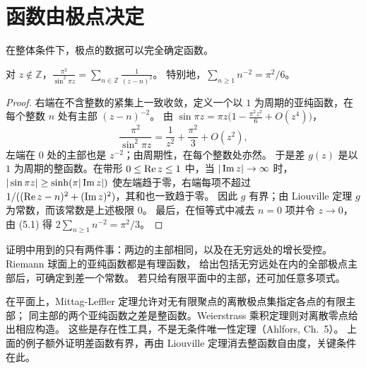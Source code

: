 \documentclass[11pt]{article}
\begin{document}
\section{函数由极点决定}
在整体条件下，极点的数据可以完全确定函数。
\begin{proposition}\label{prop:sin}
对 $z\notin\mathbb Z$，$\displaystyle\frac{\pi^2}{\sin^2\pi z}=\sum_{n\in\mathbb Z}\frac1{(z-n)^2}$。
特别地，$\sum_{n\ge1}n^{-2}=\pi^2/6$。
\end{proposition}
\begin{proof}
右端在不含整数的紧集上一致收敛，定义一个以 $1$ 为周期的亚纯函数，在每个整数 $n$ 处有主部 $(z-n)^{-2}$。
由 $\sin\pi z=\pi z\bigl(1-\tfrac{\pi^2z^2}6+O(z^4)\bigr)$，
\[
 \frac{\pi^2}{\sin^2\pi z}=\frac1{z^2}+\frac{\pi^2}3+O(z^2),                  \tag{5.1}
\]
左端在 $0$ 处的主部也是 $z^{-2}$；由周期性，在每个整数处亦然。
于是差 $g(z)$ 是以 $1$ 为周期的整函数。在带形 $0\le\operatorname{Re} z\le1$ 中，当 $|\operatorname{Im} z|\to\infty$ 时，
$|\sin\pi z|\ge\sinh(\pi|\operatorname{Im} z|)$ 使左端趋于零，右端每项不超过 $1/((\operatorname{Re} z-n)^2+(\operatorname{Im} z)^2)$，其和也一致趋于零。
因此 $g$ 有界；由 Liouville 定理 $g$ 为常数，而该常数是上述极限 $0$。
最后，在恒等式中减去 $n=0$ 项并令 $z\to0$，由 (5.1) 得 $2\sum_{n\ge1}n^{-2}=\pi^2/3$。
\end{proof}
证明中用到的只有两件事：两边的主部相同，以及在无穷远处的增长受控。
Riemann 球面上的亚纯函数都是有理函数，
给出包括无穷远处在内的全部极点主部后，可确定到差一个常数。
若只给有限平面中的主部，还可加任意多项式。

在平面上，Mittag-Leffler 定理允许对无有限聚点的离散极点集指定各点的有限主部；
同主部的两个亚纯函数之差是整函数。Weierstrass 乘积定理则对离散零点给出相应构造。
这些是存在性工具，不是无条件唯一性定理（Ahlfors, Ch.~5）。
上面的例子额外证明差函数有界，再由 Liouville 定理消去整函数自由度，关键条件在此。

\end{document}
